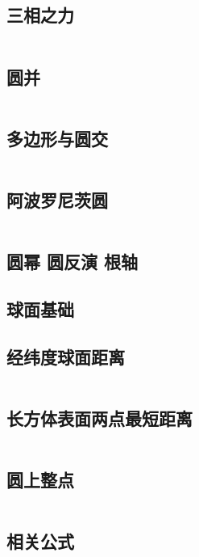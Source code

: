\documentclass[titlepage, a4paper]{article}
\newcommand\nothing{}
\renewcommand{\checkmark}[0]{\nothing}
\begin{document}
\begin{multicols}{2}
\begin{spacing}{0.6}
				\subsection{三相之力\checkmark}
				\inputminted{cpp}{src/Geometry/三角形.cpp}
				\subsection{圆并}
				\inputminted{cpp}{src/Geometry/圆并.cpp}
				\subsection{多边形与圆交}
				\inputminted{cpp}{src/Geometry/多边形和圆的交.cpp}
				\subsection{阿波罗尼茨圆}
				\inputminted{cpp}{src/Geometry/阿波罗尼茨圆.tex}
				\subsection{圆幂 圆反演 根轴}
				
				\subsection{球面基础}
				
				\subsection{经纬度球面距离\checkmark}
				\inputminted{cpp}{src/Geometry/经纬度求球面最短距离.cpp}
				\subsection{长方体表面两点最短距离}
				\inputminted{cpp}{src/Geometry/长方体表面两点最短距离.cpp}
				\subsection{圆上整点\checkmark}
				\inputminted{cpp}{src/Geometry/圆上整点.cpp}
				\subsection{相关公式}
				
				\newpage

\end{spacing}
\end{multicols}
\end{document}
